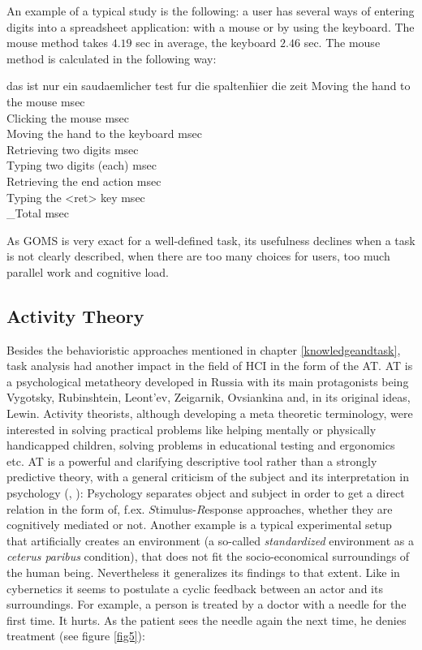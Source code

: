 An example of a typical study is the following: a user has several ways of entering digits into a spreadsheet application: with a mouse or by using the keyboard. The mouse method takes $4.19$ sec in average, the keyboard $2.46$ sec. The mouse method is calculated in the following way:

\begin{tabbing}
das ist nur ein saudaemlicher test fur die spalten\=  hier die zeit\kill
Moving the hand to the mouse  msec\\
Clicking the mouse  msec\\
Moving the hand to the keyboard  msec\\
Retrieving two digits  msec\\
Typing two digits (each) msec\\
Retrieving the end action  msec\\
Typing the <ret> key  msec\\
\_Total  msec
\end{tabbing}

As \ac{GOMS} is very exact for a well-defined task, its usefulness declines when a task is not clearly described, when there are too many choices for users, too much parallel work and cognitive load. 

\subsection{Activity Theory}
Besides the behavioristic approaches mentioned in chapter \ref{knowledgeandtask}, task analysis had another impact in the field of \ac{HCI} in the form of the \ac{AT}. \acs{AT} is a psychological metatheory developed in Russia with its main protagonists being Vygotsky, Rubinshtein, Leont'ev, Zeigarnik, Ovsiankina  and, in its original ideas, Lewin. Activity theorists, although developing a meta theoretic terminology, were interested in solving practical problems like helping mentally or physically handicapped children, solving problems in educational testing and ergonomics etc. \ac{AT} is a powerful and clarifying descriptive tool rather than a strongly predictive theory, with a general criticism of the subject and its interpretation in psychology (\cite{nardi1996activity}, \cite{leont1974problem}): Psychology separates object and subject in order to get a direct relation in the form of, f.ex. $S$timulus-$R$esponse approaches, whether they are cognitively mediated or not. Another example is a typical experimental setup that artificially creates an environment (a so-called \textit{standardized} environment as a \textit{ceterus paribus} condition), that does not fit the socio-economical surroundings of the human being. Nevertheless it generalizes its findings to that extent. Like in cybernetics it seems to postulate a cyclic feedback between an actor and its surroundings. For example, a person is treated by a doctor with a needle for the first time. It hurts. As the patient sees the needle again the next time, he denies treatment (see figure \ref{fig5}): 

